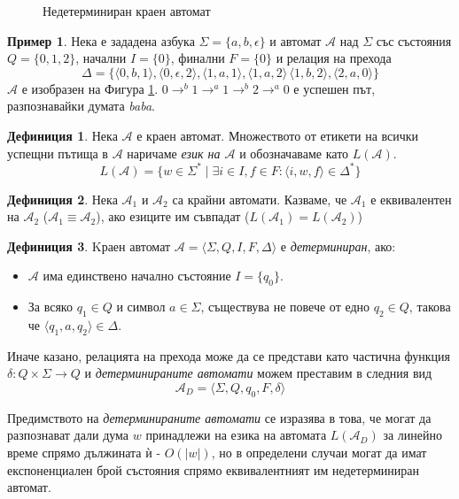 \documentclass[12pt, oneside]{article}
\theoremstyle{definition}
\newtheorem{definition}{Дефиниция}[section]
\newtheorem{example}{Пример}[section]
\begin{document}
\begin{figure}[!htb]
	\centering
	
	\caption{Недетерминиран краен автомат}
	\label{fig:Nfa}
\end{figure}

\begin{example}
	Нека е зададена азбука \( \Sigma = \{ a,b,\epsilon \} \) и автомат \( \mathcal{A} \) над \( \Sigma \) със състояния \( Q = \{ 0, 1, 2 \} \), начални \( I = \{ 0 \} \), финални \( F = \{ 0 \} \) и релация на прехода 
	\[ \Delta = \{ \langle 0, b, 1 \rangle, \langle 0, \epsilon, 2 \rangle, \langle 1, a, 1 \rangle, \langle 1, a, 2 \rangle \, \langle 1, b, 2 \rangle, \langle 2, a, 0 \rangle \} \]
	\( \mathcal{A} \) е изобразен на Фигура \ref{fig:Nfa}. \( 0 \to^{b} 1 \to^{a} 1 \to^{b} 2 \to^{a} 0 \) е успешен път, разпознавайки думата \emph{baba}.
\end{example}

\begin{definition} 
	Нека \( \mathcal{A} \) е краен автомат. Множеството от етикети на всички успещни пътища в \( \mathcal{A} \) наричаме \emph{език на \( \mathcal{A} \)} и обозначаваме като \( L(\mathcal{A}) \). \[ L(\mathcal{A}) = \{ w \in \Sigma^* \mid \exists i \in I, f \in F : \langle i, w, f \rangle \in \Delta^* \} \]
\end{definition}

\begin{definition} 
	Нека \( \mathcal{A}_1 \) и \( \mathcal{A}_2 \) са крайни автомати. Казваме, че \( \mathcal{A}_1 \) е еквивалентен на \( \mathcal{A}_2 \) (\( \mathcal{A}_1 \equiv \mathcal{A}_2 \)), ако езиците им съвпадат (\( L(\mathcal{A}_1) = L(\mathcal{A}_2) \))
\end{definition}

\begin{definition}
	Kраен автомат \( \mathcal{A} = \langle \Sigma, Q, I, F, \Delta \rangle \) е \emph{детерминиран}, ако:

	\begin{itemize}
		\item \( \mathcal{A} \) има единствено начално състояние \(I = \{q_0\}\).
		\item За всяко \( q_1 \in Q \) и символ \( a \in \Sigma \), съществува не повече от едно \( q_2 \in Q \), такова че \( \langle q_1, a, q_2 \rangle \in \Delta \).
	\end{itemize} 

	\noindent Иначе казано, релацията на прехода може да се представи като частична функция \( \delta: Q \times \Sigma \to Q \) и \emph{детерминираните автомати} можем преставим в следния вид \[ \mathcal{A}_D = \langle \Sigma, Q, q_0, F, \delta \rangle \]

	Предимството на \emph{детерминираните автомати} се изразява в това, че могат да разпознават дали дума \( w \) принадлежи на езика на автомата \( L(\mathcal{A}_D) \) за линейно време спрямо дължината ѝ - \( O(|w|) \), но в определени случаи могат да имат експоненциален брой състояния спрямо еквивалентният им недетерминиран автомат.
\end{definition}
\end{document}
